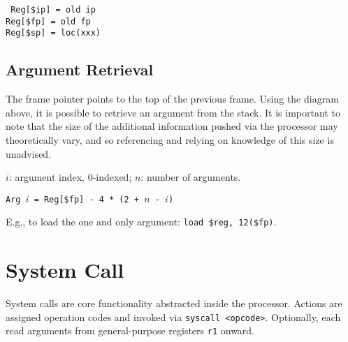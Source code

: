 \documentclass[10pt]{article}
\begin{document}
\texttt{%
Reg[\$ip] = old ip\\%
Reg[\$fp] = old fp\\%
Reg[\$sp] = loc(xxx)\\%
}

\subsection{Argument Retrieval}

The frame pointer points to the top of the previous frame.
Using the diagram above, it is possible to retrieve an argument from the stack.
It is important to note that the size of the additional information pushed via the processor may theoretically vary, and so referencing and relying on knowledge of this size is unadvised.

\begin{center}
    \(i\): argument index, 0-indexed; \(n\): number of arguments.
    
    \texttt{Arg \(i\) = Reg[\$fp] - 4 * (2 + \(n\) - \(i\))}

    E.g., to load the one and only argument: \texttt{load \$reg, 12(\$fp)}.
\end{center}

\section{System Call}

System calls are core functionality abstracted inside the processor.
Actions are assigned operation codes and invoked via \texttt{syscall <opcode>}.
Optionally, each read arguments from general-purpose registers \texttt{r1} onward.
\end{document}
